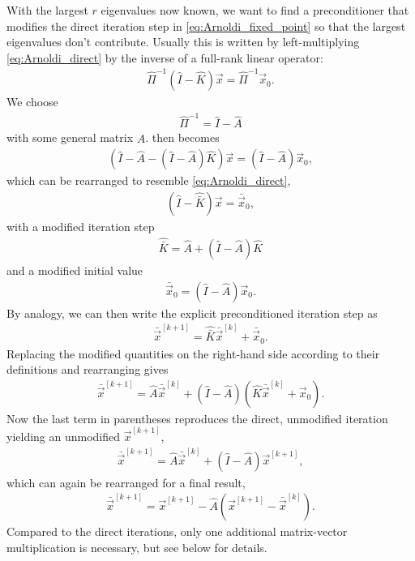 With the largest $r$ eigenvalues now known, we want to find a preconditioner that modifies the direct iteration step in \cref{eq:Arnoldi_fixed_point} so that the largest eigenvalues don't contribute. Usually this is written by left-multiplying \cref{eq:Arnoldi_direct} by the inverse of a full-rank linear operator:
\begin{gather}
  \hat{\Pi}^{-1} \left ( \hat{I} - \hat{K} \right ) \vec{x} = \hat{\Pi}^{-1} \vec{x}_{0}. \label{eq:precon}
\end{gather}
We choose
\begin{gather}
  \hat{\Pi}^{-1} = \hat{I} - \hat{A}
\end{gather}
with some general matrix $\hat{A}$.  then becomes
\begin{gather}
  \left ( \hat{I} - \hat{A} - \left ( \hat{I} - \hat{A} \right ) \hat{K} \right ) \vec{x} = \left ( \hat{I} - \hat{A} \right ) \vec{x}_{0},
\end{gather}
which can be rearranged to resemble \cref{eq:Arnoldi_direct},
\begin{gather}
  \left ( \hat{I} - \hat{\bar{K}} \right ) \vec{x} = \bar{\vec{x}}_{0},
\end{gather}
with a modified iteration step
\begin{gather}
  \hat{\bar{K}} = \hat{A} + \left ( \hat{I} - \hat{A} \right ) \hat{K} \label{eq:Kbar}
\end{gather}
and a modified initial value
\begin{gather}
  \bar{\vec{x}}_{0} = \left ( \hat{I} - \hat{A} \right ) \vec{x}_{0}.
\end{gather}
By analogy, we can then write the explicit preconditioned iteration step as
\begin{gather}
  \bar{\vec{x}}^{[k+1]} = \hat{\bar{K}} \bar{\vec{x}}^{[k]} + \bar{\vec{x}}_{0}.
\end{gather}
Replacing the modified quantities on the right-hand side according to their definitions and rearranging gives
\begin{gather}
  \bar{\vec{x}}^{[k+1]} = \hat{A} \bar{\vec{x}}^{[k]} + \left ( \hat{I} - \hat{A} \right ) \left ( \hat{K} \bar{\vec{x}}^{[k]} + \vec{x}_{0} \right ).
\end{gather}
Now the last term in parentheses reproduces the direct, unmodified iteration yielding an unmodified $\vec{x}^{[k+1]}$,
\begin{gather}
  \bar{\vec{x}}^{[k+1]} = \hat{A} \bar{\vec{x}}^{[k]} + \left ( \hat{I} - \hat{A} \right ) \vec{x}^{[k+1]},
\end{gather}
which can again be rearranged for a final result,
\begin{gather}
  \bar{\vec{x}}^{[k+1]} = \vec{x}^{[k+1]} - \hat{A} \left ( \vec{x}^{[k+1]} - \bar{\vec{x}}^{[k]} \right ).
\end{gather}
Compared to the direct iterations, only one additional matrix-vector multiplication is necessary, but see below for details.

